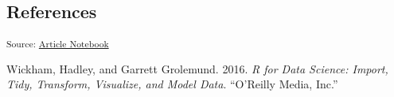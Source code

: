 \documentclass[
  letterpaper,
  DIV=11,
  numbers=noendperiod]{scrartcl}
\newlength{\cslhangindent}
\newenvironment{CSLReferences}[2] %
 {\begin{list}{}{%
  \setlength{\itemindent}{0pt}
  \setlength{\leftmargin}{0pt}
  \setlength{\parsep}{0pt}
  \ifodd #1
   \setlength{\leftmargin}{\cslhangindent}
   \setlength{\itemindent}{-1\cslhangindent}
  \fi
  \setlength{\itemsep}{#2\baselineskip}}}
 {\end{list}}
\begin{document}
\subsection*{References}\label{references}

\textsubscript{Source:
\href{https://fryagbye.github.io/tinderboxwithquarto/main.qmd.html}{Article
Notebook}}

\label{refs}
\begin{CSLReferences}{1}{0}
Wickham, Hadley, and Garrett Grolemund. 2016. \emph{R for Data Science:
Import, Tidy, Transform, Visualize, and Model Data}. {``O'Reilly Media,
Inc.''}

\end{CSLReferences}
\end{document}
